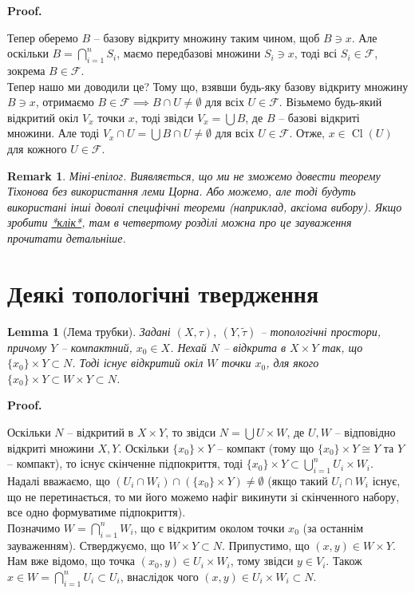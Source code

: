 \documentclass[a4paper, 10pt]{article}
\makeatletter
\theoremstyle{theoremdd}
\newtheorem{remark}[theorem]{Remark}
\newtheorem{lemma}[theorem]{Lemma}
\DeclareMathOperator{\Cl}{Cl}
\renewenvironment{proof}[1][Proof.\\]{\par
\pushQED{\hfill \qed}%
\normalfont \topsep6\p@\@plus6\p@\relax
\trivlist
\item\relax
{\bfseries
#1\@addpunct{.}}\hspace\labelsep\ignorespaces
}{%
\popQED\endtrivlist\@endpefalse
}
\makeatother
\begin{document}
\begin{proof}
Тепер оберемо $B$ -- базову відкриту множину таким чином, щоб $B \ni x$. Але оскільки $B = \displaystyle\bigcap_{i=1}^n S_i$, маємо передбазові множини $S_i \ni x$, тоді всі $S_i \in \mathcal{F}$, зокрема $B \in \mathcal{F}$.\\
Тепер нашо ми доводили це? Тому що, взявши будь-яку базову відкриту множину $B \ni x$, отримаємо $B \in \mathcal{F} \implies B \cap U \neq \emptyset$ для всіх $U \in \mathcal{F}$. Візьмемо будь-який відкритий окіл $V_x$ точки $x$, тоді звідси $V_x = \displaystyle\bigcup B$, де $B$ -- базові відкриті множини. Але тоді $V_x \cap U = \displaystyle\bigcup B \cap U \neq \emptyset$ для всіх $U \in \mathcal{F}$. Отже, $x \in \Cl(U)$ для кожного $U \in \mathcal{F}$.
\end{proof}

\begin{remark}
Міні-епілог. Виявляється, що ми не зможемо довести теорему Тіхонова без використання леми Цорна. Або можемо, але тоді будуть використані інші доволі специфічні теореми (наприклад, аксіома вибору). Якщо зробити \textcolor{red}{\href{https://www.math.toronto.edu/~herzig/Tychonoff-lecture.pdf}{*клік*}}, там в четвертому розділі можна про це зауваження прочитати детальніше.
\end{remark}
\newpage

\section{Деякі топологічні твердження}
\begin{lemma}[Лема трубки]
Задані $(X,\tau),\ (Y,\tilde{\tau})$ -- топологічні простори, причому $Y$ -- компактний, $x_0 \in X$. Нехай $N$ -- відкрита в $X \times Y$ так, що $\{x_0\} \times Y \subset N$. Тоді існує відкритий окіл $W$ точки $x_0$, для якого $\{x_0\} \times Y \subset W \times Y \subset N$.
\end{lemma}

\begin{proof}
Оскільки $N$ -- відкритий в $X \times Y$, то звідси $N = \displaystyle\bigcup U \times W$, де $U,W$ -- відповідно відкриті множини $X,Y$. Оскільки $\{x_0\} \times Y$ -- компакт (тому що $\{x_0\} \times Y \cong Y$ та $Y$ -- компакт), то існує скінченне підпокриття, тоді $\{x_0\} \times Y \subset \displaystyle\bigcup_{i=1}^n U_i \times W_i$. Надалі вважаємо, що $(U_i \cap W_i) \cap (\{x_0\} \times Y) \neq \emptyset$ (якщо такий $U_i \cap W_i$ існує, що не перетинається, то ми його можемо нафіг викинути зі скінченного набору, все одно формуватиме підпокриття).\\
Позначимо $W = \displaystyle\bigcap_{i=1}^n W_i$, що є відкритим околом точки $x_0$ (за останнім зауваженням). Стверджуємо, що $W \times Y \subset N$. Припустимо, що $(x,y) \in W \times Y$. Нам вже відомо, що точка $(x_0,y) \in U_i \times W_i$, тому звідси $y \in V_i$. Також $x \in W = \displaystyle\bigcap_{i=1}^n U_i \subset U_i$, внаслідок чого $(x,y) \in U_i \times W_i \subset N$.
\end{proof}
\end{document}
